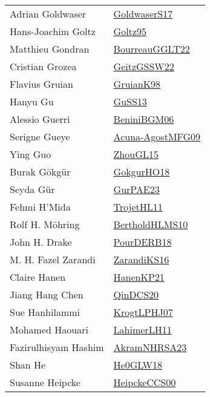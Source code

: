 {\begin{longtable}{p{4cm}p{20cm}}
Adrian Goldwaser & \href{papers/GoldwaserS17.pdf}{GoldwaserS17}\cite{GoldwaserS17} \\
Hans{-}Joachim Goltz & \href{papers/Goltz95.pdf}{Goltz95}\cite{Goltz95} \\
Matthieu Gondran & \href{articles/BourreauGGLT22.pdf}{BourreauGGLT22}\cite{BourreauGGLT22} \\
Cristian Grozea & \href{papers/GeitzGSSW22.pdf}{GeitzGSSW22}\cite{GeitzGSSW22} \\
Flavius Gruian & \href{papers/GruianK98.pdf}{GruianK98}\cite{GruianK98} \\
Hanyu Gu & \href{papers/GuSS13.pdf}{GuSS13}\cite{GuSS13} \\
Alessio Guerri & \href{papers/BeniniBGM06.pdf}{BeniniBGM06}\cite{BeniniBGM06} \\
Serigne Gueye & \href{papers/Acuna-AgostMFG09.pdf}{Acuna-AgostMFG09}\cite{Acuna-AgostMFG09} \\
Ying Guo & \href{papers/ZhouGL15.pdf}{ZhouGL15}\cite{ZhouGL15} \\
Burak G{\"{o}}kg{\"{u}}r & \href{}{GokgurHO18}\cite{GokgurHO18} \\
Seyda G{\"{u}}r & \href{articles/GurPAE23.pdf}{GurPAE23}\cite{GurPAE23} \\
Fehmi H'Mida & \href{articles/TrojetHL11.pdf}{TrojetHL11}\cite{TrojetHL11} \\
Rolf H. M{\"{o}}hring & \href{papers/BertholdHLMS10.pdf}{BertholdHLMS10}\cite{BertholdHLMS10} \\
John H. Drake & \href{articles/PourDERB18.pdf}{PourDERB18}\cite{PourDERB18} \\
M. H. Fazel Zarandi & \href{articles/ZarandiKS16.pdf}{ZarandiKS16}\cite{ZarandiKS16} \\
Claire Hanen & \href{papers/HanenKP21.pdf}{HanenKP21}\cite{HanenKP21} \\
Jiang Hang Chen & \href{articles/QinDCS20.pdf}{QinDCS20}\cite{QinDCS20} \\
Sue Hanhilammi & \href{papers/KrogtLPHJ07.pdf}{KrogtLPHJ07}\cite{KrogtLPHJ07} \\
Mohamed Haouari & \href{papers/LahimerLH11.pdf}{LahimerLH11}\cite{LahimerLH11} \\
Fazirulhisyam Hashim & \href{articles/AkramNHRSA23.pdf}{AkramNHRSA23}\cite{AkramNHRSA23} \\
Shan He & \href{papers/He0GLW18.pdf}{He0GLW18}\cite{He0GLW18} \\
Susanne Heipcke & \href{articles/HeipckeCCS00.pdf}{HeipckeCCS00}\cite{HeipckeCCS00} \\

\end{longtable}}
